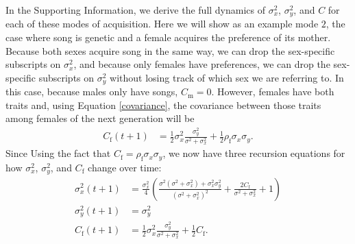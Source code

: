 \documentclass{article}
\newcommand{\x}[1]{\text{#1}}
\begin{document}
In the Supporting Information, we derive the full dynamics of $\sigma_x^2$, $\sigma_y^2$, and $C$ for each of these modes of acquisition. Here we will show as an example mode $2$, the case where song is genetic and a female acquires the preference of its mother. Because both sexes acquire song in the same way, we can drop the sex-specific subscripts on $\sigma_x^2$, and because only females have preferences, we can drop the sex-specific subscripts on $\sigma_y^2$ without losing track of which sex we are referring to. In this case, because males only have songs, $C_\x{m}=0$. However, females have both traits and, using Equation \ref{covariance}, the covariance between those traits among females of the next generation will be 
\begin{align*}
C_\x{f}(t+1)&=\frac{1}{2}\sigma_{x}^2\frac{\sigma_{y}^2}{\sigma^2+\sigma_{x}^2}+\frac{1}{2}\rho_\x{f}\sigma_{x}\sigma_{y}.
\end{align*}
Since 
Using the fact that $C_\x{f}=\rho_\x{f}\sigma_{x}\sigma_{y}$, we now have three recursion equations for how $\sigma_{x}^2$, $\sigma_{y}^2$, and $C_\x{f}$ change over time:
\begin{align*}
\sigma_x^2(t+1)&=\frac{\sigma_x^2}{4}\left(\frac{\sigma^2(\sigma^2+\sigma_{x}^2)+\sigma_{x}^2\sigma_{y}^2}{(\sigma^2+\sigma_{x}^2)^2}+\frac{2C_\x{f}}{\sigma^2+\sigma_x^2}+1\right)
\\ \sigma_y^2(t+1)&=\sigma_y^2
\\ C_\x{f}(t+1)&=\frac{1}{2}\sigma_{x}^2\frac{\sigma_{y}^2}{\sigma^2+\sigma_{x}^2}+\frac{1}{2}C_\x{f}.
\end{align*}
\end{document}
